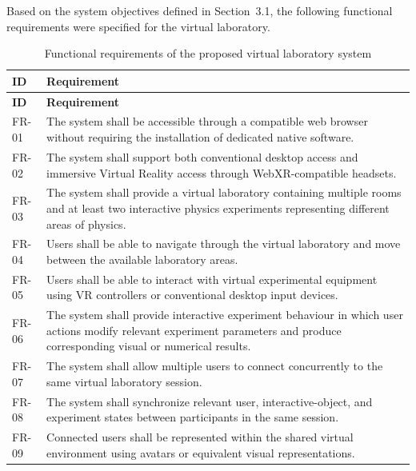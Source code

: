 Based on the system objectives defined in Section~3.1, the following functional
requirements were specified for the virtual laboratory.

\renewcommand{\arraystretch}{1.3}
\begin{longtable}{p{2cm} p{12cm}}
\caption{Functional requirements of the proposed virtual laboratory system}
\label{tab:functional_requirements} \\
\hline
\textbf{ID} & \textbf{Requirement} \\
\hline
\endfirsthead

\hline
\textbf{ID} & \textbf{Requirement} \\
\hline
\endhead

FR-01 &
The system shall be accessible through a compatible web browser without
requiring the installation of dedicated native software. \\
\hline

FR-02 &
The system shall support both conventional desktop access and immersive
Virtual Reality access through WebXR-compatible headsets. \\
\hline

FR-03 &
The system shall provide a virtual laboratory containing multiple rooms and
at least two interactive physics experiments representing different areas of
physics. \\
\hline

FR-04 &
Users shall be able to navigate through the virtual laboratory and move
between the available laboratory areas. \\
\hline

FR-05 &
Users shall be able to interact with virtual experimental equipment using VR
controllers or conventional desktop input devices. \\
\hline

FR-06 &
The system shall provide interactive experiment behaviour in which user
actions modify relevant experiment parameters and produce corresponding
visual or numerical results. \\
\hline

FR-07 &
The system shall allow multiple users to connect concurrently to the same
virtual laboratory session. \\
\hline

FR-08 &
The system shall synchronize relevant user, interactive-object, and
experiment states between participants in the same session. \\
\hline

FR-09 &
Connected users shall be represented within the shared virtual environment
using avatars or equivalent visual representations. \\
\hline


\end{longtable}

